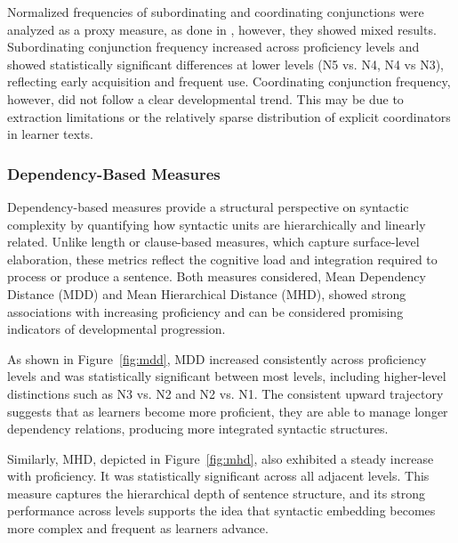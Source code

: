 Normalized frequencies of subordinating and coordinating conjunctions were analyzed as a proxy measure, as done in \citet{Vyatkina2012}, however, they showed mixed results. Subordinating conjunction frequency increased across proficiency levels and showed statistically significant differences at lower levels (N5 vs. N4, N4 vs N3), reflecting early acquisition and frequent use. Coordinating conjunction frequency, however, did not follow a clear developmental trend. This may be due to extraction limitations or the relatively sparse distribution of explicit coordinators in learner texts.

\subsubsection{Dependency-Based Measures}

Dependency-based measures provide a structural perspective on syntactic complexity by quantifying how syntactic
units are hierarchically and linearly related. Unlike length or clause-based measures, which capture surface-level
elaboration, these metrics reflect the cognitive load and integration required to process or produce a sentence.
Both measures considered, Mean Dependency Distance (MDD) and Mean Hierarchical Distance (MHD), showed strong
associations with increasing proficiency and can be considered promising indicators of developmental progression.

As shown in Figure~\ref{fig:mdd}, MDD increased consistently across proficiency levels and was statistically
significant between most levels, including higher-level distinctions such as N3 vs. N2 and N2 vs. N1. The consistent
upward trajectory suggests that as learners become more proficient, they are able to manage longer dependency
relations, producing more integrated syntactic structures.


Similarly, MHD, depicted in Figure~\ref{fig:mhd}, also exhibited a steady increase with proficiency. It was
statistically significant across all adjacent levels. This measure captures the hierarchical depth of sentence
structure, and its strong performance across levels supports the idea that syntactic embedding becomes more complex
and frequent as learners advance.

